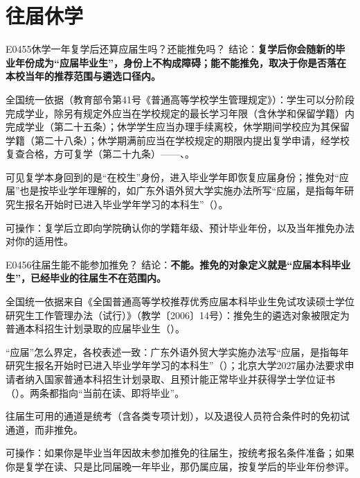 \section{往届休学}
\begin{qa}{E0455}{休学一年复学后还算应届生吗？还能推免吗？}
结论：\textbf{复学后你会随新的毕业年份成为“应届毕业生”，身份上不构成障碍；能不能推免，取决于你是否落在本校当年的推荐范围与遴选口径内。}

全国统一依据（教育部令第41号《普通高等学校学生管理规定》）：学生可以分阶段完成学业，除另有规定外应当在学校规定的最长学习年限（含休学和保留学籍）内完成学业（第二十五条）；休学学生应当办理手续离校，休学期间学校应为其保留学籍（第二十八条）；休学期满前应当在学校规定的期限内提出复学申请，经学校复查合格，方可复学（第二十九条）——、。

可见复学本身回到的是“在校生”身份，进入毕业学年即恢复应届身份；推免对“应届”也是按毕业学年理解的，如广东外语外贸大学实施办法所写“应届，是指每年研究生报名开始时已进入毕业学年学习的本科生”（）。

可操作：复学后立即向学院确认你的学籍年级、预计毕业年份，以及当年推免办法对你的适用性。
\end{qa}

\begin{qa}{E0456}{往届生能不能参加推免？}
结论：\textbf{不能。推免的对象定义就是“应届本科毕业生”，已经毕业的往届生不在范围内。}

全国统一依据来自《全国普通高等学校推荐优秀应届本科毕业生免试攻读硕士学位研究生工作管理办法（试行）》（教学〔2006〕14号）：推免生的遴选对象被限定为普通本科招生计划录取的应届毕业生（）。

“应届”怎么界定，各校表述一致：广东外语外贸大学实施办法写“应届，是指每年研究生报名开始时已进入毕业学年学习的本科生”（）；北京大学2027届办法要求申请者纳入国家普通本科招生计划录取、且预计能正常毕业并获得学士学位证书（）。两条都指向“当前在读、即将毕业”。

往届生可用的通道是统考（含各类专项计划），以及退役人员符合条件时的免初试通道，而非推免。

可操作：如果你是毕业当年因故未参加推免的往届生，按统考报名条件准备；如果你是复学在读、只是比同届晚一年毕业，那仍属应届，按复学后的毕业年份参评。
\end{qa}


